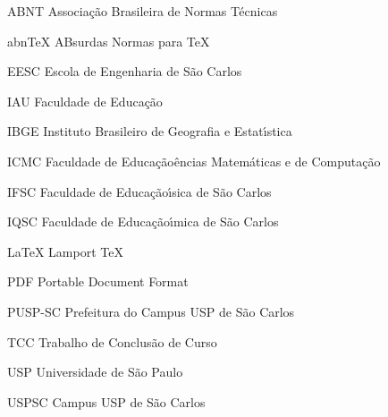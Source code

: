 \begin{siglas}
    \item[ABNT] Associa\c{c}\~ao Brasileira de Normas T\'ecnicas
    \item[abnTeX] ABsurdas Normas para TeX
	\item[EESC] Escola de Engenharia de S\~ao Carlos
	\item[IAU] Faculdade de Educa\c{c}\~ao
	\item[IBGE] Instituto Brasileiro de Geografia e Estat\'{\i}stica
	\item[ICMC] Faculdade de Educa\c{c}\~ao\^encias Matem\'aticas e de Computa\c{c}\~ao
	\item[IFSC] Faculdade de Educa\c{c}\~ao\'{\i}sica de S\~ao Carlos
	\item[IQSC] Faculdade de Educa\c{c}\~ao\'{\i}mica de S\~ao Carlos
	\item[LaTeX] Lamport TeX
	\item[PDF] Portable Document Format
	\item[PUSP-SC] Prefeitura do Campus USP de S\~ao Carlos
	\item[TCC] Trabalho de Conclus\~ao de Curso
	\item[USP] Universidade de S\~ao Paulo
	\item[USPSC] Campus USP de S\~ao Carlos
\end{siglas}
